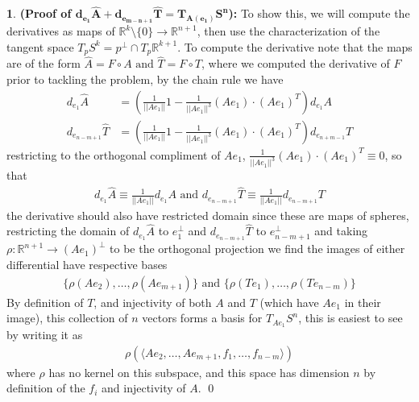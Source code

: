 \documentclass[10.5pt]{article}
\theoremstyle{definition}
\newtheorem{pb}{}
\newcommand{\set}[1]{\{#1\}}
\newcommand{\gen}[1]{\langle#1\rangle}
\newcommand{\norm}[1]{\lvert\lvert#1\rvert\rvert}
\newcommand{\tand}{\text{ and }}
\begin{document}
\begin{pb}
        \textbf{(Proof of \(\mathbf{d_{e_1}\widehat{A} + d_{e_{m-n+1}}\widehat{T} = T_{A(e_1)}S^n}\)):} To show this, we will compute the derivatives as maps of \(\mathbb{R}^k\setminus\set{0} \to \mathbb{R}^{n+1}\), then use the characterization of the tangent space \(T_pS^k = p^\perp \cap T_p \mathbb{R}^{k+1}\). To compute the derivative note that the maps are of the form \(\widehat{A} = F\circ A \tand \widehat{T} = F \circ T\), where we computed the derivative of \(F\) prior to tackling the problem, by the chain rule we have
        \begin{align*}
            d_{e_1}\widehat{A} &= \left(\frac{1}{\norm{Ae_1}}1 - \frac{1}{\norm{Ae_1}^3}(Ae_1)\cdot(Ae_1)^T\right)d_{e_1}A\\
            d_{e_{n-m+1}}\widehat{T} &= \left(\frac{1}{\norm{Ae_1}}1 - \frac{1}{\norm{Ae_1}^3}(Ae_1)\cdot(Ae_1)^T\right)d_{e_{n+m-1}}T
        \end{align*}
        restricting to the orthogonal compliment of \(Ae_1\), \(\frac{1}{\norm{Ae_1}^3}(Ae_1)\cdot(Ae_1)^T \equiv 0\), so that
        \begin{align*}
            d_{e_1}\widehat{A} \equiv \frac{1}{\norm{Ae_1}}d_{e_1}A \tand d_{e_{n-m+1}}\widehat{T} \equiv \frac{1}{\norm{Ae_1}}d_{e_{n-m+1}}T
        \end{align*}
        the derivative should also have restricted domain since these are maps of spheres, restricting the domain of \(d_{e_1}\widehat{A}\) to \(e_1^\perp\) and \(d_{e_{n-m+1}}\widehat{T}\) to \(e_{n-m+1}^\perp\) and taking \(\rho: \mathbb{R}^{n+1} \to (Ae_1)^\perp\) to be the orthogonal projection we find the images of either differential have respective bases
        \begin{align*}
            \set{\rho(Ae_2),\hdots,\rho(Ae_{m+1})} \tand \set{\rho(Te_1),\hdots,\rho(Te_{n-m})}
        \end{align*}
        By definition of \(T\), and injectivity of both \(A\) and \(T\) (which have \(Ae_1\) in their image), this collection of \(n\) vectors forms a basis for \(T_{Ae_1}S^n\), this is easiest to see by writing it as
        \begin{align*}
            \rho(\gen{Ae_2,\hdots,Ae_{m+1},f_1,\hdots,f_{n-m}})
        \end{align*}
        where \(\rho\) has no kernel on this subspace, and this space has dimension \(n\) by definition of the \(f_i\) and injectivity of \(A\). \qed
        

\end{pb}
\end{document}
